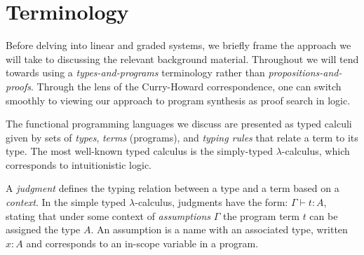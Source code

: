 

\section{Terminology}
Before delving into linear and graded systems, we briefly frame the approach we
will take to discussing the relevant background material. Throughout we will
tend towards using a \textit{types-and-programs} terminology rather than
\textit{propositions-and-proofs}. Through the lens of the Curry-Howard
correspondence, one can switch smoothly to viewing our approach to program
synthesis as proof search in logic.

The functional programming languages we discuss are presented as typed
calculi given by sets of \textit{types}, \textit{terms} (programs), and \textit{typing
 rules} that relate a term to its type. The most well-known typed
calculus is the simply-typed $\lambda$-calculus, which corresponds to
intuitionistic logic.

A \textit{judgment} defines the typing relation between a type and a term based on a
\textit{context}. In the simple typed $\lambda$-calculus, judgments have the
form: $\Gamma \vdash t : A$, stating that under some context of
\textit{assumptions} $\Gamma$ the program term $t$ can be assigned the type $A$.
An assumption is a name with an associated type, written $x : A$ and
corresponds to an in-scope variable in a program.

